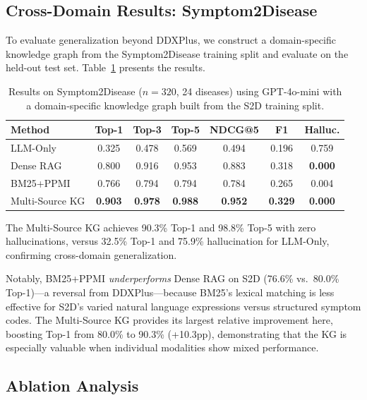 \documentclass[preprint,12pt]{elsarticle}
\begin{document}
\subsection{Cross-Domain Results: Symptom2Disease}
\label{sec:cross_domain}

To evaluate generalization beyond DDXPlus, we construct a domain-specific knowledge graph from the Symptom2Disease training split and evaluate on the held-out test set. Table~\ref{tab:s2d} presents the results.

\begin{table}[t]
\centering
\caption{Results on Symptom2Disease ($n{=}320$, 24 diseases) using GPT-4o-mini with a domain-specific knowledge graph built from the S2D training split.}
\label{tab:s2d}
\begin{tabular}{lcccccc}
\toprule
\textbf{Method} & \textbf{Top-1} & \textbf{Top-3} & \textbf{Top-5} & \textbf{NDCG@5} & \textbf{F1} & \textbf{Halluc.} \\
\midrule
LLM-Only       & 0.325 & 0.478 & 0.569 & 0.494 & 0.196 & 0.759 \\
Dense RAG       & 0.800 & 0.916 & 0.953 & 0.883 & 0.318 & \textbf{0.000} \\
BM25+PPMI       & 0.766 & 0.794 & 0.794 & 0.784 & 0.265 & 0.004 \\
Multi-Source KG & \textbf{0.903} & \textbf{0.978} & \textbf{0.988} & \textbf{0.952} & \textbf{0.329} & \textbf{0.000} \\
\bottomrule
\end{tabular}
\end{table}

The Multi-Source KG achieves 90.3\% Top-1 and 98.8\% Top-5 with zero hallucinations, versus 32.5\% Top-1 and 75.9\% hallucination for LLM-Only, confirming cross-domain generalization.

Notably, BM25+PPMI \emph{underperforms} Dense RAG on S2D (76.6\% vs.\ 80.0\% Top-1)---a reversal from DDXPlus---because BM25's lexical matching is less effective for S2D's varied natural language expressions versus structured symptom codes. The Multi-Source KG provides its largest relative improvement here, boosting Top-1 from 80.0\% to 90.3\% (+10.3pp), demonstrating that the KG is especially valuable when individual modalities show mixed performance.

\subsection{Ablation Analysis}
\label{sec:ablation}
\end{document}
